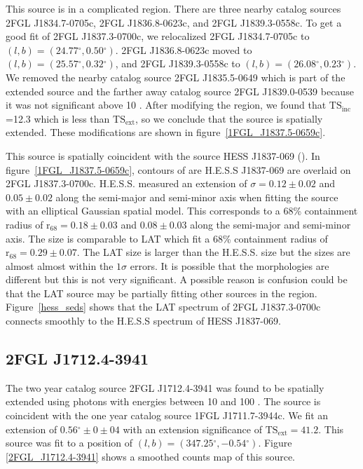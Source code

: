 \documentclass[12pt,preprint]{aastex}
\newcommand{\gev}{\text{GeV}\xspace}
\newcommand{\tev}{\text{TeV}\xspace}
\newcommand{\tsext}{{\ensuremath{\text{TS}_\text{ext}}}\xspace}
\newcommand{\tsinc}{\ensuremath{\text{TS}_\text{inc}}\xspace}
\newcommand{\rsixeight}{{\ensuremath{\text{r}_{68}}}\xspace}
\renewcommand{\deg}{\ensuremath{^\circ}\xspace}
\begin{document}
This source is in a complicated region. There are three nearby catalog
sources 
2FGL J1834.7-0705c, 2FGL J1836.8-0623c, and 2FGL J1839.3-0558c.
To get a good fit of 2FGL J1837.3-0700c,
we relocalized 
2FGL J1834.7-0705c to $(l,b)=(24.77\deg,0.50\deg)$.  
2FGL J1836.8-0623c moved to $(l,b)=(25.57\deg,0.32\deg)$, and 
2FGL J1839.3-0558c to $(l,b)=(26.08\deg,0.23\deg)$.  
We removed the nearby catalog source 2FGL J1835.5-0649 which is part
of the extended source and the farther away catalog
source 2FGL J1839.0-0539 because it was not significant above 10 \gev.
After modifying the region, we found that \tsinc=12.3 which is less
than \tsext, so we conclude that the source is spatially extended. These
modifications are shown in figure~\ref{1FGL_J1837.5-0659c}.

This source is spatially coincident with the \tev source HESS J1837-069
(\cite{hess_plane_survey}).  In figure~\ref{1FGL_J1837.5-0659c},
contours of are H.E.S.S J1837-069 are overlaid on 2FGL
J1837.3-0700c. H.E.S.S. measured an extension of $\sigma=0.12\pm0.02$
and $0.05\pm0.02$ along the semi-major and semi-minor axis when fitting
the source with an elliptical Gaussian spatial model.  This corresponds to
a 68\% containment radius of $\rsixeight=0.18\pm0.03$ and $0.08\pm0.03$
along the semi-major and semi-minor axis. The size is comparable to
LAT which fit a 68\% containment radius of $\rsixeight=0.29\pm0.07$.
The LAT size is larger than the H.E.S.S. size but the sizes are almost
almost within the $1\sigma$ errors. It is possible that the morphologies
are different but this is not very significant.  A possible reason is
confusion could be that the LAT source may be partially fitting other
sources in the region.  Figure~\ref{hess_seds} shows that the LAT
spectrum of 2FGL J1837.3-0700c connects smoothly to the H.E.S.S spectrum
of HESS J1837-069.



\subsection{2FGL J1712.4-3941}
\label{section_2FGL_J1712.4-3941}


The two year catalog source 2FGL J1712.4-3941 was found to be
spatially extended using photons with energies between 10 \gev and
100 \gev. The source is coincident with the one year catalog source
1FGL J1711.7-3944c. We fit an extension of $0.56\deg\pm0\pm04$ with an
extension significance of $\tsext=41.2$. This source was fit to a position
of $(l,b)=(347.25\deg,-0.54\deg)$. Figure \ref{2FGL_J1712.4-3941} shows
a smoothed counts map of this source.
\end{document}
